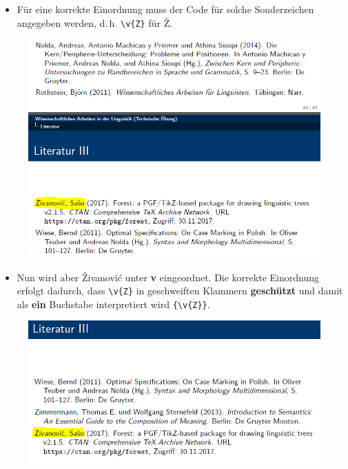 \begin{frame}[fragile]

\begin{itemize}
	\item Für eine korrekte Einordnung muss der Code für solche Sonderzeichen angegeben werden, d.\,h. \lstinline|\v{Z}| für \v{Z}.
\end{itemize}

\begin{figure}
	\centering
	\includegraphics[scale=.4]{../../texfiles-beamer/tex-material/WissArb-latex/bib-Liste-false2}
\end{figure}


\end{frame}


\begin{frame}[fragile]

\begin{itemize}
	\item Nun wird aber \v{Z}ivanovi{\'c} unter \textbf{v} eingeordnet. Die korrekte Einordnung erfolgt dadurch, dass \lstinline|\v{Z}| in geschweiften Klammern \textbf{geschützt} und damit als \textbf{ein} Buchstabe interpretiert wird \lstinline|{\v{Z}}|. 
\end{itemize}

\begin{figure}
	\centering
	\includegraphics[scale=.4]{../../texfiles-beamer/tex-material/WissArb-latex/bib-Liste-right}
\end{figure}


\end{frame}	
	
